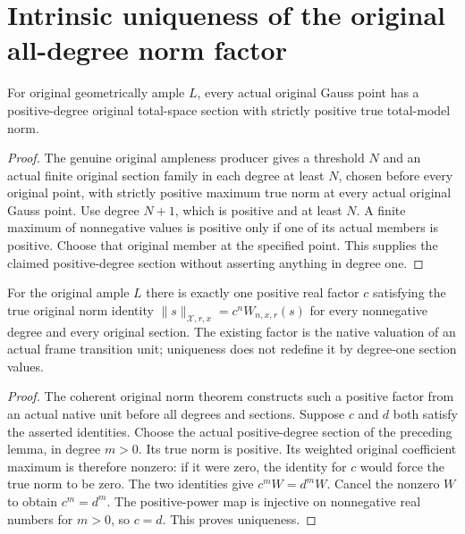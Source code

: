 \section{Intrinsic uniqueness of the original all-degree norm factor}

\begin{lemma}\label{lem:native-tc-actual-positive-degree-section}
\leanok
{}
For original geometrically ample $L$, every actual original Gauss
point has a positive-degree original total-space section with
strictly positive true total-model norm.
\end{lemma}
\begin{proof}
The genuine original ampleness producer gives a threshold $N$
and an actual finite original section family in each degree at
least $N$, chosen before every original point, with strictly
positive maximum true norm at every actual original Gauss
point. Use degree $N+1$, which is positive and at least $N$.
A finite maximum of nonnegative values is positive only if
one of its actual members is positive. Choose that original
member at the specified point. This supplies the claimed
positive-degree section without asserting anything in degree one.
\end{proof}

\begin{theorem}\label{thm:native-tc-unique-positive-all-power-factor}
\leanok
{}
For the original ample $L$ there is exactly one positive real
factor $c$ satisfying the true original norm identity
$\lVert s\rVert_{\mathcal X,r,x}=c^n W_{n,x,r}(s)$
for every nonnegative degree and every original section.
The existing factor is the native valuation of an actual frame
transition unit; uniqueness does not redefine it by degree-one
section values.
\end{theorem}
\begin{proof}
The coherent original norm theorem constructs such a positive
factor from an actual native unit before all degrees and
sections. Suppose $c$ and $d$ both satisfy the asserted
identities. Choose the actual positive-degree section of the
preceding lemma, in degree $m>0$. Its true norm is positive.
Its weighted original coefficient maximum is therefore
nonzero: if it were zero, the identity for $c$ would force
the true norm to be zero. The two identities give
$c^mW=d^mW$. Cancel the nonzero $W$ to obtain $c^m=d^m$.
The positive-power map is injective on nonnegative real
numbers for $m>0$, so $c=d$. This proves uniqueness.
\end{proof}

